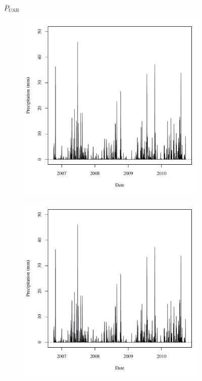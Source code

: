 \subfiguretop
\begin{landscape}
	\begin{figure}
		\centering
		$ \displaystyle \overline{P}_{USR} $
		\begin{subfigure}{0.7\textwidth}
			\centering
			\includegraphics[width=\tableCustomSize]{"Figures/Results_USR/Deterministic/A Precip"}
		\end{subfigure}%
		\begin{subfigure}{0.7\textwidth}
			\centering
			\includegraphics[width=\tableCustomSize]{"Figures/Results_USR/Stochastic/A Precip"}

\end{subfigure}
\end{figure}
\end{landscape}
